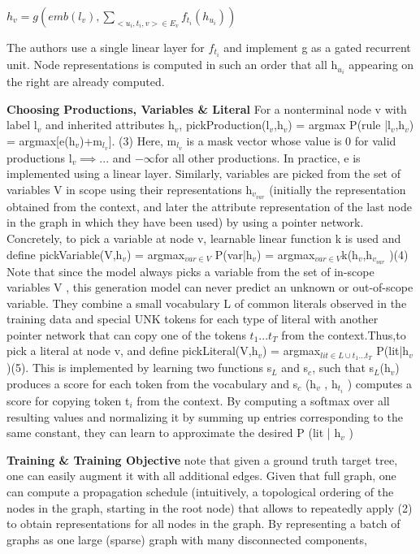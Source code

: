 \documentclass{article}
\begin{document}
\begin{math}
h_v = g(emb(l_v), \sum_{<u_i,t_i,v>\in E_v} f_{t_i} (h_{u_i}))
\end{math}

The authors use a single linear layer for $f_{t_i}$ and implement g as a gated recurrent unit. Node representations is computed in such an order that all h$_{u_i}$ appearing on the right are already computed.

\textbf{Choosing Productions, Variables \& Literal} For a nonterminal node v with label l$_v$ and inherited attributes h$_v$, pickProduction(l$_v$,h$_v$) = argmax P(rule |l$_v$,h$_v$) = argmax[e(h$_v$)+m$_{l_v}$]. (3) Here, m$_{l_v}$ is a mask vector whose value is 0 for valid productions l$_v \implies ...$ and $-\infty$for all other productions. In practice, e is implemented using a linear layer. Similarly, variables are picked from the set of variables V in scope using their representations h$_{v_{var}}$ (initially the representation obtained from the context, and later the attribute representation of the last node in the graph in which they have been used) by using a pointer network. Concretely, to pick a variable at node v, learnable linear function k is used and define pickVariable(V,h$_v$) = argmax$_{var \in V}$ P(var|h$_v$) = argmax$_{var \in V}$k(h$_v$,h$_{v_{var}}$ )(4) Note that since the model always picks a variable from the set of in-scope variables V , this generation model can never predict an unknown or out-of-scope variable. They combine a small vocabulary L of common literals observed in the training data and special UNK tokens for each type of literal with another pointer network that can copy one of the tokens $t_1...t_T$ from the context.Thus,to pick a literal at node v, and define pickLiteral(V,h$_v$) = argmax$_{lit\in L \cup {t_1...t_T}}$ P(lit|h$_v$)(5). This is implemented by learning two functions s$_L$ and s$_c$, such that s$_L$(h$_v$) produces a score for each token from the vocabulary and s$_c$ (h$_v$ , h$_{t_i}$ ) computes a score for copying token t$_i$ from the context. By computing a softmax over all resulting values and normalizing it by summing up entries corresponding to the same constant, they can learn to approximate the desired P (lit | h$_v$ )

\textbf{Training \& Training Objective} note that given a ground truth target tree, one can easily augment it with all additional edges. Given that full graph, one can compute a propagation schedule (intuitively, a topological ordering of the nodes in the graph, starting in the root node) that allows to repeatedly apply (2) to obtain representations for all nodes in the graph. By representing a batch of graphs as one large (sparse) graph with many disconnected components,
\end{document}
